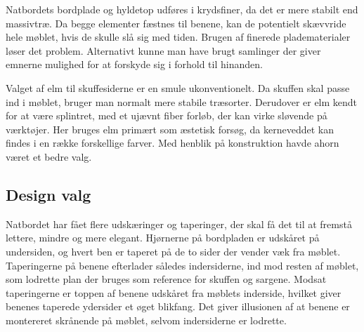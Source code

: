 Natbordets bordplade og hyldetop udføres i krydsfiner, da det er mere stabilt
end massivtræ. Da begge elementer fæstnes til benene, kan de potentielt
skævvride hele møblet, hvis de skulle slå sig med tiden. Brugen af finerede
pladematerialer løser det problem. Alternativt kunne man have brugt samlinger
der giver emnerne mulighed for at forskyde sig i forhold til hinanden.

Valget af elm til skuffesiderne er en smule ukonventionelt. Da skuffen skal
passe ind i møblet, bruger man normalt mere stabile træsorter.
Derudover er elm kendt for at være splintret, med et ujævnt fiber forløb, der kan
virke sløvende på værktøjer. Her bruges elm primært som æstetisk forsøg, da
kerneveddet kan findes i en række forskellige farver. Med henblik på
konstruktion havde ahorn været et bedre valg.

\subsection*{Design valg}
Natbordet har fået flere udskæringer og taperinger, der skal få det til at
fremstå lettere, mindre og mere elegant. Hjørnerne på bordpladen er udskåret på
undersiden, og hvert ben er taperet på de to sider der vender væk fra møblet.
Taperingerne på benene efterlader således indersiderne, ind mod resten af
møblet, som lodrette plan der bruges som reference for skuffen og sargene.
Modsat taperingerne er toppen af benene udskåret fra møblets inderside, hvilket
giver benenes taperede ydersider et øget blikfang. Det giver illusionen af at
benene er montereret skrånende på møblet, selvom indersiderne
er lodrette.
